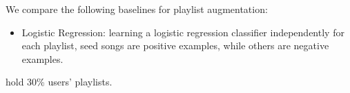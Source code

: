 We compare the following baselines for playlist augmentation:
\begin{itemize}
\item Logistic Regression: learning a logistic regression classifier independently for each playlist,
      seed songs are positive examples, while others are negative examples.
\end{itemize}


\begin{table}[!h]
\centering
\caption{Statistics of dataset for playlist generation for known users}
\label{tab:stats_cold}
\end{table}

hold 30\% users' playlists.
\begin{table}[!h]
\centering
\caption{Statistics of dataset for playlist generation for new users}
\label{tab:stats_cold}
\end{table}

%

